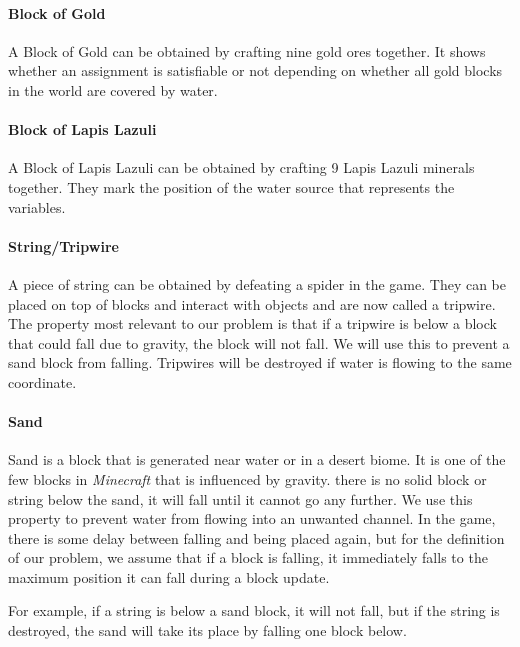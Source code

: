 \paragraph{Block of Gold\cite{minecraftfandom:bog}}
A Block of Gold can be obtained by crafting nine gold ores together.
\newline It shows whether an assignment is satisfiable or not depending on whether all gold blocks in the world are covered by water.

\paragraph{Block of Lapis Lazuli\cite{minecraftfandom:boll}}
A Block of Lapis Lazuli can be obtained by crafting 9 Lapis Lazuli minerals together.
They mark the position of the water source that represents the variables.

\paragraph{String/Tripwire\cite{minecraftfandom:string}}
A piece of string can be obtained by defeating a spider in the game.
They can be placed on top of blocks and interact with objects and are now called a tripwire.
The property most relevant to our problem is that if a tripwire is below a block that could fall due to gravity, the block will not fall.
We will use this to prevent a sand block from falling.
Tripwires will be destroyed if water is flowing to the same coordinate.

\paragraph{Sand\cite{minecraftfandom:sand}}
Sand is a block that is generated near water or in a desert biome.
It is one of the few blocks in \textit{Minecraft} that is influenced by gravity.
 there is no solid block or string below the sand, it will fall until it cannot go any further.
We use this property to prevent water from flowing into an unwanted channel. In the game, there is some delay between falling and being placed again, but for the definition of our problem, we assume that if a block is falling, it immediately falls to the maximum position it can fall during a block update. 

\noindent \newline For example, if a string is below a sand block, it will not fall, but if the string is destroyed, the sand will take its place by falling one block below.

